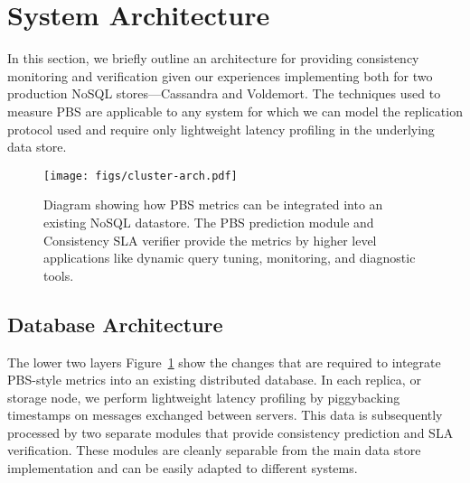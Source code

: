\section{System Architecture}
\label{sec:architecture}

In this section, we briefly outline an architecture for providing
consistency monitoring and verification given our experiences
implementing both for two production NoSQL stores---Cassandra and
Voldemort. The techniques used to measure PBS are applicable to any
system for which we can model the replication protocol used and
require only lightweight latency profiling in the underlying data
store.


\begin{figure}
\centering
\texttt{[image: figs/cluster-arch.pdf]}
\caption{Diagram showing how PBS metrics can be integrated into an
  existing NoSQL datastore. The PBS prediction module and Consistency
  SLA verifier provide the metrics by higher level applications like
  dynamic query tuning, monitoring, and diagnostic tools.}
\label{fig:pbs-sys-arch}
\end{figure}


\subsection{Database Architecture}
\label{sec:dbarch}

The lower two layers Figure~\ref{fig:pbs-sys-arch} show the changes
that are required to integrate PBS-style metrics into an existing
distributed database. In each replica, or storage node, we perform
lightweight latency profiling by piggybacking timestamps on messages
exchanged between servers. This data is subsequently processed by two
separate modules that provide consistency prediction and SLA
verification. These modules are cleanly separable from the main data
store implementation and can be easily adapted to different systems.\\

